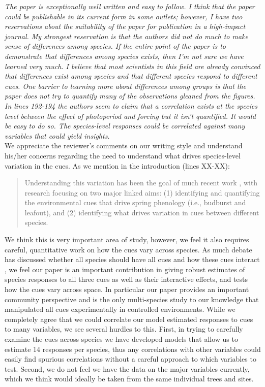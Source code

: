 \documentclass[11pt,a4paper]{article}
\begin{document}
\emph{The paper is exceptionally well written and easy to follow. I think that the paper could be
publishable in its current form in some outlets; however, I have two reservations about the
suitability of the paper for publication in a high-impact journal. My strongest reservation
is that the authors did not do much to make sense of differences among species. If the entire
point of the paper is to demonstrate that differences among species exists, then I'm not sure
we have learned very much. I believe that most scientists in this field are already convinced
that differences exist among species and that different species respond to different cues. One barrier to learning more about differences among groups is that the paper does not try to quantify many of the observations gleaned from the figures. In lines 192-194 the authors seem
to claim that a correlation exists at the species level between the effect of photoperiod and
forcing but it isn't quantified. It would be easy to do so. The species-level responses could be correlated against many variables that could yield insights.}\\

We appreciate the reviewer's comments on our writing style and understand his/her concerns regarding the need to understand what drives species-level variation in the cues. As we mention in the introduction (lines XX-XX):

\begin{quote}
Understanding this variation has been the goal of much recent work \citep{Rutishauser:2008fu,Laube2015,donnelly2017,zohner2017}, with research focusing on two major linked aims: (1) identifying and quantifying the environmental cues that drive spring phenology (i.e., budburst and leafout), and (2) identifying what drives variation in cues between different species.
\end{quote}
We think this is very important area of study, however, we feel it also requires careful, quantitative work on how the cues vary across species. As much debate has discussed whether all species should have all cues and how these cues interact \citep{Korner:2010,Chuine:xb}, we feel our paper is an important contribution in giving robust estimates of species responses to all three cues as well as their interactive effects, and tests how the cues vary across space. In particular our paper provides an important community perspective and is the only multi-species study to our knowledge that manipulated all cues experimentally in controlled environments. While we completely agree that we could correlate our model estimated responses to cues to many variables, we see several hurdles to this. First, in trying to carefully examine the cues across species we have developed models that allow us to estimate 14 responses per species, thus any correlations with other variables could easily find spurious correlations without a careful approach to which variables to test. Second, we do not feel we have the data on the major variables currently, which we think would ideally be taken from the same individual trees and sites. \\
\end{document}
